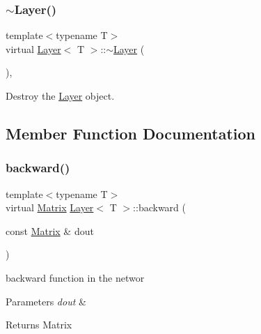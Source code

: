 \subsubsection{\texorpdfstring{$\sim$Layer()}{~Layer()}}
{\footnotesize\ttfamily template$<$typename T$>$ \\
virtual \mbox{\hyperlink{class_layer}{Layer}}$<$ T $>$\+::$\sim$\mbox{\hyperlink{class_layer}{Layer}} (\begin{DoxyParamCaption}{ }\end{DoxyParamCaption})\hspace{0.3cm}{\ttfamily [virtual]}, {\ttfamily [default]}}



Destroy the \mbox{\hyperlink{class_layer}{Layer}} object. 



\subsection{Member Function Documentation}
\mbox{\label{class_layer_ac4c13a3a85bfdd4d7d4d18669e3299fe}} 
\subsubsection{\texorpdfstring{backward()}{backward()}}
{\footnotesize\ttfamily template$<$typename T$>$ \\
virtual \mbox{\hyperlink{class_layer_a22b1e7286096aa62bd245536c8ebdaf1}{Matrix}} \mbox{\hyperlink{class_layer}{Layer}}$<$ T $>$\+::backward (\begin{DoxyParamCaption}\item[{const \mbox{\hyperlink{class_layer_a22b1e7286096aa62bd245536c8ebdaf1}{Matrix}} \&}]{dout }\end{DoxyParamCaption})\hspace{0.3cm}{\ttfamily [pure virtual]}}



backward function in the networ 


\begin{DoxyParams}{Parameters}
{\em dout} & \\
\hline
\end{DoxyParams}
\begin{DoxyReturn}{Returns}
Matrix 
\end{DoxyReturn}


